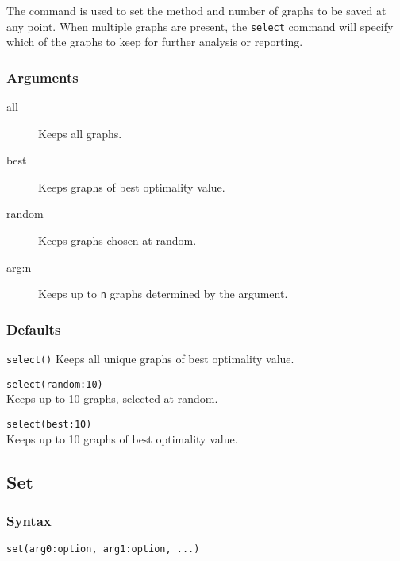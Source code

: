 	\begin{phygdescription}
		{The command is used to set the method and number of graphs to be saved at any point.
		When multiple graphs are present, the \texttt{select} command will specify which of the 
		graphs to keep for further analysis or reporting.}
	\end{phygdescription}
				
	\subsubsection{Arguments}
		\begin{description}
			\item[all] Keeps all graphs.
		
			\item[best] Keeps graphs of best optimality value.
			
			\item[random] Keeps graphs chosen at random.
			
			\item[arg:n] Keeps up to \texttt{n} graphs determined by the argument.
		\end{description}

	\subsubsection{Defaults}
		\texttt{select()} Keeps all unique graphs of best optimality value.
		
	\begin{example}
		\item{\texttt{select(random:10)}\\ Keeps up to 10 graphs, selected at random.}
						
		\item{\texttt{select(best:10)}\\ Keeps up to 10 graphs of best optimality value.}
	\end{example}

\subsection{Set}
	\subsubsection{Syntax}
		\texttt{set(arg0:option, arg1:option, ...)}
	
